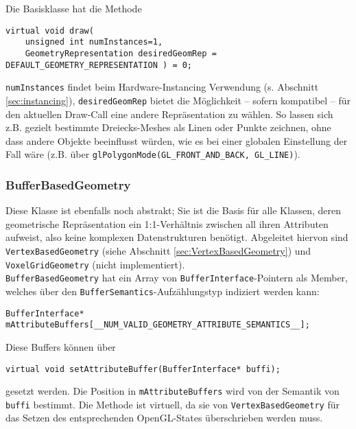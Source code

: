 	Die Basisklasse hat die Methode
	\begin{lstlisting}	
virtual void draw(
	unsigned int numInstances=1,
	GeometryRepresentation desiredGeomRep = DEFAULT_GEOMETRY_REPRESENTATION ) = 0;
	\end{lstlisting}
	
	\lstinline|numInstances| findet beim Hardware-Instancing Verwendung (s. Abschnitt \ref{sec:instancing}),
	\lstinline|desiredGeomRep| bietet die Möglichkeit -- sofern kompatibel -- für den aktuellen Draw-Call
	eine andere Repräsentation zu wählen. So lassen sich z.B. gezielt bestimmte Dreiecks-Meshes als Linen
	oder Punkte zeichnen, ohne dass andere Objekte beeinflusst würden, wie es bei einer globalen Einstellung 
	der Fall wäre (z.B. über \lstinline|glPolygonMode(GL_FRONT_AND_BACK, GL_LINE)|).
	
	\subsubsection{BufferBasedGeometry}
		Diese Klasse ist ebenfalls noch abstrakt; Sie ist die Basis für alle Klassen, deren geometrische
		Repräsentation ein 1:1-Verhältnis zwischen all ihren Attributen aufweist, also keine komplexen
		Datenstrukturen benötigt. 
		Abgeleitet hiervon sind \lstinline|VertexBasedGeometry| (siehe Abschnitt \ref{sec:VertexBasedGeometry})
		und \lstinline|VoxelGridGeometry| (nicht implementiert).\\
		
		\lstinline|BufferBasedGeometry| hat ein Array von \lstinline|BufferInterface|-Pointern als Member,
		welches über den \lstinline|BufferSemantics|-Aufzählungstyp indiziert werden kann:
		\begin{lstlisting}			
BufferInterface* mAttributeBuffers[__NUM_VALID_GEOMETRY_ATTRIBUTE_SEMANTICS__];
		\end{lstlisting}	
		Diese Buffers können über 
		\begin{lstlisting}			
virtual void setAttributeBuffer(BufferInterface* buffi);
		\end{lstlisting}
		gesetzt werden.  Die Position in \lstinline|mAttributeBuffers| wird von der Semantik von \lstinline|buffi| 
		bestimmt. Die Methode ist virtuell, da sie von \lstinline|VertexBasedGeometry| 
		für das Setzen des entsprechenden OpenGL-States überschrieben werden muss.		
		
